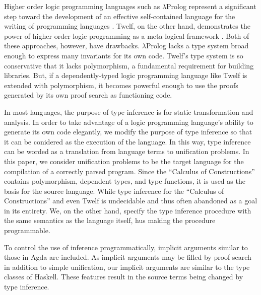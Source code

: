 Higher order logic programming languages such as $\lambda$Prolog represent a significant
step toward the development of an effective self-contained language for the writing 
of programming languages \citep{miller1988overview}. 
Twelf, on the other hand,
demonstrates the power of higher order logic programming as a meta-logical framework
\citep{pfenning1999system}. Both of these approaches, however, have drawbacks. $\lambda$Prolog lacks a type system broad enough to express many invariants for its own code. Twelf’s type system
is so conservative that it lacks polymorphism, a fundamental requirement for building
libraries. But, if a dependently-typed logic programming language like Twelf is extended with polymorphism, it becomes powerful enough to use the proofs generated
by its own proof search as functioning code. 

In most languages, the purpose of type inference is for static transformation and 
analysis. 
In order to take advantage of a logic programming language’s ability to generate its own code elegantly, we modify the purpose of type
inference so that it can be conidered as the execution of the language.
In this way, type inference can be worded as a translation from language terms to unification
problems. In this paper, we consider unification problems to be the target
language for the compilation of a correctly parsed program. Since the ``Calculus of Constructions''
\citep{coquand1986calculus} contains polymorphism, dependent types, and type functions, it is used
as the basis for the source language. While type inference for the ``Calculus of Constructions'' and even Twelf is undecidable\citep{Dowek93tlca} and thus often abandoned as a goal in its entirety. We, on the other hand, specify the 
type inference procedure with the same semantics as the language itself,
hus making the procedure programmable.

To control the use of inference programmatically, implicit arguments similar to those
in Agda are included. As implicit arguments may be filled by proof search in addition
to simple unification, our implicit arguments are similar to the type classes of Haskell. 
These features result in the source terms being changed by type inference.

